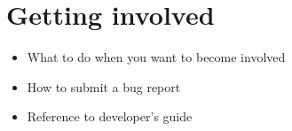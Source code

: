 \chapter{Getting involved}
\label{chap:devel}

\begin{itemize}
\item What to do when you want to become involved
\item How to submit a bug report
\item Reference to developer's guide
\end{itemize}

